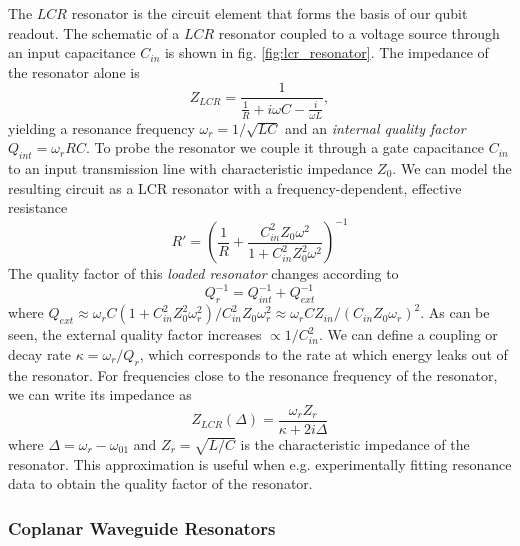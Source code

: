 The $LCR$ resonator is the circuit element that forms the basis of our qubit readout. The schematic of a $LCR$ resonator coupled to a voltage source through an input capacitance $C_{in}$ is  shown in fig. \ref{fig:lcr_resonator}. The impedance of the resonator alone is
%
\begin{equation}
Z_{LCR} = \frac{1}{\frac{1}{R}+i\omega C - \frac{i}{\omega L}},
\end{equation}
%
yielding a resonance frequency $\omega_r = 1/\sqrt{LC}$ and an {\it internal quality factor} $Q_{int} = \omega_r R C$. To probe the resonator we couple it through a gate capacitance $C_{in}$ to an input transmission line with characteristic impedance $Z_0$. We can model the resulting circuit as a LCR resonator with a frequency-dependent, effective resistance
%
\begin{equation}
R' = \left(\frac{1}{R}+\frac{C_{in}^2 Z_0 \omega^2}{1+C_{in}^2 Z_0^2 \omega^2}\right)^{-1}
\end{equation}
%
The quality factor of this {\it loaded resonator} changes according to 
%
\begin{equation}
Q_r^{-1} = Q^{-1}_{int}+Q^{-1}_{ext}
\end{equation}
%
where $Q_{ext} \approx \omega_r C (1+C_{in}^2Z_0^2\omega_r^2)/C_{in}^2 Z_0\omega_r^2 \approx \omega_r C Z_{in}/(C_{in}Z_0 \omega_r)^2$. As can be seen, the external quality factor increases $\propto 1 / C_{in}^2$. We can define a coupling or decay rate $\kappa=\omega_r/Q_r$, which corresponds to the rate at which energy leaks out of the resonator. For frequencies close to the resonance frequency of the resonator, we can write its impedance as
%
\begin{equation}
Z_{LCR}(\Delta) = \frac{\omega_r Z_r}{\kappa+2i\Delta} \label{eq:lcr_lorentzian}
\end{equation}
%
where $\Delta = \omega_r-\omega_{01}$ and $Z_r = \sqrt{L/C}$ is the characteristic impedance of the resonator. This approximation is useful when e.g. experimentally fitting resonance data to obtain the quality factor of the resonator.

\subsubsection{Coplanar Waveguide Resonators}

